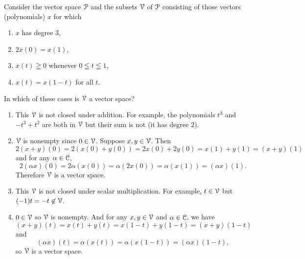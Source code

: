  Consider the vector space $\P$ and the subsets $\V$ of $\P$
consisting of those vectors (polynomials) $x$ for which
\begin{enumerate}
\item $x$ has degree $3$,
\item $2x(0) = x(1)$,
\item $x(t) \geqq 0$ whenever $0\leqq t\leqq1$,
\item $x(t) = x(1 - t)$ for all $t$.
\end{enumerate}
In which of these cases is $\V$ a vector space?
\begin{solution}
  \begin{enumerate}
  \item This $\V$ is not closed under addition. For example, the
    polynomials $t^3$ and $-t^3 + t^2$ are both in $\V$ but their sum
    is not (it has degree $2$).
  \item $\V$ is nonempty since $0\in\V$. Suppose $x,y\in\V$. Then
    \begin{equation*}
      2(x + y)(0) = 2(x(0) + y(0))
      = 2x(0) + 2y(0) = x(1) + y(1) = (x + y)(1)
    \end{equation*}
    and for any $\alpha\in\C$,
    \begin{equation*}
      2(\alpha x)(0) = 2\alpha(x(0)) = \alpha(2x(0))
      = \alpha(x(1)) = (\alpha x)(1).
    \end{equation*}
    Therefore $\V$ is a vector space.
  \item This $\V$ is not closed under scalar multiplication. For
    example, $t\in\V$ but $(-1)t = -t\not\in\V$.
  \item $0\in\V$ so $\V$ is nonempty. And for any $x,y\in\V$ and
    $\alpha\in\C$, we have
    \begin{equation*}
      (x + y)(t) = x(t) + y(t) = x(1 - t) + y(1 - t) = (x + y)(1 - t)
    \end{equation*}
    and
    \begin{equation*}
      (\alpha x)(t) = \alpha(x(t)) = \alpha(x(1 - t)) = (\alpha x)(1 - t),
    \end{equation*}
    so $\V$ is a vector space. \qedhere
  \end{enumerate}
\end{solution}
